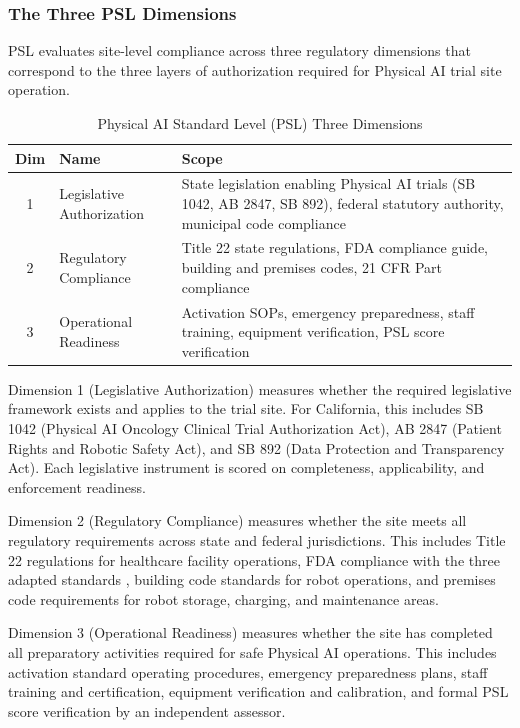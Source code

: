 \subsubsection{The Three PSL Dimensions}

PSL evaluates site-level compliance across three regulatory dimensions that
correspond to the three layers of authorization required for Physical AI trial
site operation.

\begin{table}[H]
\centering
\caption{Physical AI Standard Level (PSL) Three Dimensions}
\label{tab:psl-dimensions}
\small
\begin{tabularx}{\textwidth}{c l X}
\toprule
\textbf{Dim} & \textbf{Name} & \textbf{Scope} \\
\midrule
1 & Legislative Authorization & State legislation enabling Physical AI trials (SB 1042, AB 2847, SB 892), federal statutory authority, municipal code compliance \\
2 & Regulatory Compliance & Title 22 state regulations, FDA compliance guide, building and premises codes, 21 CFR Part compliance \\
3 & Operational Readiness & Activation SOPs, emergency preparedness, staff training, equipment verification, PSL score verification \\
\bottomrule
\end{tabularx}
\end{table}

Dimension 1 (Legislative Authorization) measures whether the required
legislative framework exists and applies to the trial site. For California,
this includes SB 1042 (Physical AI Oncology Clinical Trial Authorization Act),
AB 2847 (Patient Rights and Robotic Safety Act), and SB 892 (Data Protection
and Transparency Act). Each legislative instrument is scored on completeness,
applicability, and enforcement readiness.

Dimension 2 (Regulatory Compliance) measures whether the site meets all
regulatory requirements across state and federal jurisdictions. This includes
Title 22 regulations for healthcare facility operations, FDA compliance with
the three adapted standards \cite{ich-adapt, cfr50-adapt, cfr312-adapt},
building code standards for robot operations, and premises code requirements
for robot storage, charging, and maintenance areas.

Dimension 3 (Operational Readiness) measures whether the site has completed all
preparatory activities required for safe Physical AI operations. This includes
activation standard operating procedures, emergency preparedness plans, staff
training and certification, equipment verification and calibration, and formal
PSL score verification by an independent assessor.

